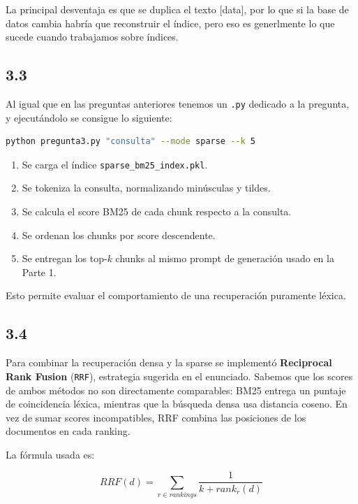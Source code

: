 \documentclass{article}
\begin{document}
La principal desventaja es que se duplica el texto [data], por lo que si la base de datos cambia habría que reconstruir el índice, pero eso es generlmente lo que sucede cuando trabajamos sobre índices. 

\subsection*{3.3}

Al igual que en las preguntas anteriores tenemos un \texttt{.py} dedicado a la pregunta, y ejecutándolo se consigue lo siguiente: 

\begin{lstlisting}[language=Bash]
python pregunta3.py "consulta" --mode sparse --k 5
\end{lstlisting}


\begin{enumerate}
    \item Se carga el índice \texttt{sparse\_bm25\_index.pkl}.
    \item Se tokeniza la consulta, normalizando minúsculas y tildes.
    \item Se calcula el score BM25 de cada chunk respecto a la consulta.
    \item Se ordenan los chunks por score descendente.
    \item Se entregan los top-$k$ chunks al mismo prompt de generación usado en la Parte 1.
\end{enumerate}

Esto permite evaluar el comportamiento de una recuperación puramente léxica. 

\subsection*{3.4}

Para combinar la recuperación densa y la sparse se implementó \textbf{Reciprocal Rank Fusion} (\texttt{RRF}), estrategia sugerida en el enunciado. Sabemos que los scores de ambos métodos no son directamente comparables: BM25 entrega un puntaje de coincidencia léxica, mientras que la búsqueda densa usa distancia coseno. En vez de sumar scores incompatibles, RRF combina las posiciones de los documentos en cada ranking.

La fórmula usada es:

\begin{equation*}
RRF(d) = \sum_{r \in rankings} \frac{1}{k + rank_r(d)}
\end{equation*}
\end{document}
